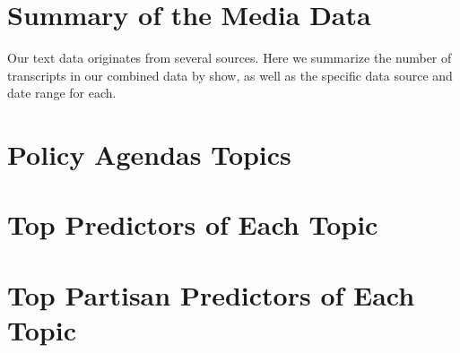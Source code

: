 \documentclass[12pt, letterpaper]{article}
\begin{document}
\section{Summary of the Media Data}
\label{si1}
Our text data originates from several sources. Here we summarize the number of transcripts in our combined data by show, as well as the specific data source and date range for each.
\scriptsize


\clearpage
\section{Policy Agendas Topics}
\label{si2}


\clearpage
\section{Top Predictors of Each Topic}
\label{si_top20}

\clearpage


\clearpage
\section{Top Partisan Predictors of Each Topic}

\end{document}
